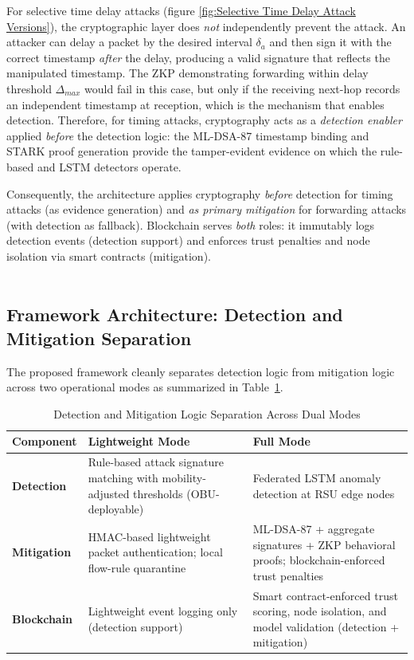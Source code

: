 \documentclass[12pt, a4paper]{report}
\begin{document}
For selective time delay attacks (figure \ref{fig:Selective Time Delay Attack Versions}), the cryptographic
layer does \emph{not} independently prevent the attack. An attacker can
delay a packet by the desired interval $\delta_a$ and then sign it with
the correct timestamp \emph{after} the delay, producing a valid
signature that reflects the manipulated timestamp. The ZKP demonstrating
forwarding within delay threshold $\Delta_{max}$ would fail in this
case, but only if the receiving next-hop records an independent
timestamp at reception, which is the mechanism that enables detection.
Therefore, for timing attacks, cryptography acts as a \emph{detection
enabler} applied \emph{before} the detection logic: the ML-DSA-87 timestamp binding and STARK proof generation provide the tamper-evident evidence on which
the rule-based and LSTM detectors operate.

Consequently, the architecture applies cryptography \emph{before}
detection for timing attacks (as evidence generation) and \emph{as
primary mitigation} for forwarding attacks (with detection as fallback).
Blockchain serves \emph{both} roles: it immutably logs detection events
(detection support) and enforces trust penalties and node isolation via
smart contracts (mitigation).
\\ \\




\subsection{Framework Architecture: Detection and Mitigation Separation}
\label{sec:framework_arch}


The proposed framework cleanly separates detection logic from mitigation
logic across two operational modes as summarized in Table~\ref{tab:dm_separation}.

\begin{table}[H]
\centering
\caption{Detection and Mitigation Logic Separation Across Dual Modes}
\label{tab:dm_separation}
\renewcommand{\arraystretch}{1.1}
\footnotesize
\begin{tabular}{|p{2.8cm}|p{2.8cm}|p{2.8cm}|}
\hline
\textbf{Component} & \textbf{Lightweight Mode} & \textbf{Full Mode} \\
\hline
\textbf{Detection} 
& Rule-based attack signature matching with mobility-adjusted thresholds (OBU-deployable) 
& Federated LSTM anomaly detection at RSU edge nodes \\
\hline
\textbf{Mitigation} 
& HMAC-based lightweight packet authentication; local flow-rule quarantine 
& ML-DSA-87 + aggregate signatures + ZKP behavioral proofs; blockchain-enforced trust penalties \\
\hline
\textbf{Blockchain} 
& Lightweight event logging only (detection support) 
& Smart contract-enforced trust scoring, node isolation, and model validation (detection + mitigation) \\
\hline
\end{tabular}
\end{table}
\end{document}
